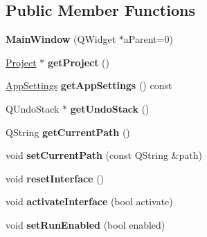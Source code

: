 \subsection*{Public Member Functions}
\begin{DoxyCompactItemize}
\item 
\hypertarget{class_main_window_a40af634a8fd9ec29ca51838c18663c9a}{{\bfseries Main\-Window} (Q\-Widget $\ast$a\-Parent=0)}\label{class_main_window_a40af634a8fd9ec29ca51838c18663c9a}

\item 
\hypertarget{class_main_window_a2a8af72f86fc82fb6274fd84e96030fa}{\hyperlink{class_project}{Project} $\ast$ {\bfseries get\-Project} ()}\label{class_main_window_a2a8af72f86fc82fb6274fd84e96030fa}

\item 
\hypertarget{class_main_window_a31b7503788dd50d7a025f47abd7eed31}{\hyperlink{class_app_settings}{App\-Settings} {\bfseries get\-App\-Settings} () const }\label{class_main_window_a31b7503788dd50d7a025f47abd7eed31}

\item 
\hypertarget{class_main_window_a612e6e50587192d5fb0d63ed2d694afe}{Q\-Undo\-Stack $\ast$ {\bfseries get\-Undo\-Stack} ()}\label{class_main_window_a612e6e50587192d5fb0d63ed2d694afe}

\item 
\hypertarget{class_main_window_a51ffab89183f3982db7daf9ba7c51b7d}{Q\-String {\bfseries get\-Current\-Path} ()}\label{class_main_window_a51ffab89183f3982db7daf9ba7c51b7d}

\item 
\hypertarget{class_main_window_a72de6919fe0b177d38b2252167bc0f93}{void {\bfseries set\-Current\-Path} (const Q\-String \&path)}\label{class_main_window_a72de6919fe0b177d38b2252167bc0f93}

\item 
\hypertarget{class_main_window_a83ade542ff208b1101a5dfc89695c7cf}{void {\bfseries reset\-Interface} ()}\label{class_main_window_a83ade542ff208b1101a5dfc89695c7cf}

\item 
\hypertarget{class_main_window_a1e13e0fb13f7156c22f6502642425753}{void {\bfseries activate\-Interface} (bool activate)}\label{class_main_window_a1e13e0fb13f7156c22f6502642425753}

\item 
\hypertarget{class_main_window_a45b1595064c241ae86f932ccb68aa85c}{void {\bfseries set\-Run\-Enabled} (bool enabled)}\label{class_main_window_a45b1595064c241ae86f932ccb68aa85c}


\end{DoxyCompactItemize}
